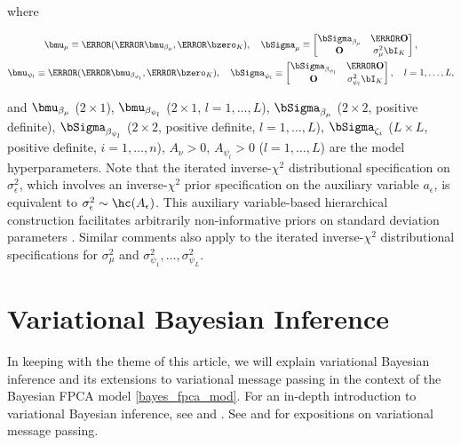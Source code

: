 \documentclass[ba]{imsart}
\numberwithin{equation}{section}
\theoremstyle{plain}
\def\sigsqeps{\sigma^2_{\epsilon}}
\def\aeps{a_{\epsilon}}
\def\sigsqmu{\sigma^2_{\mu}}
\newcommand\sigsqpsi[1]{\sigma^2_{\psi_{#1}}}
\begin{document}
\noindent where

\begin{equation}
\begin{gathered}
	\bmu_\mu \equiv \T{(\T{\bmu_{\beta_\mu}}, \T{\bzero_K})}, \quad
	\bSigma_\mu \equiv \begin{bmatrix}
		\bSigma_{\beta_\mu} & \T{\textbf{O}} \\
		\textbf{O} & \sigsqmu \bI_{K}
	\end{bmatrix}, \\
	$$
	\bmu_{\psi_l} \equiv \T{(\T{\bmu_{\beta_{\psi_l}}}, \T{\bzero_K})}, \quad
	\bSigma_{\psi_l} \equiv \begin{bmatrix}
		\bSigma_{\beta_{\psi_l}} & \T{\textbf{O}} \\
		\textbf{O} & \sigsqpsi{l} \bI_{K}
	\end{bmatrix}, \quad l = 1, \dots, L,
\end{gathered}
\label{sub_vecs_mats}
\end{equation}

\noindent and $\bmu_{\beta_\mu}$ ($2 \times 1$), $\bmu_{\beta_{\psi_l}}$ ($2 \times 1$, $l = 1, \dots, L$),
$\bSigma_{\beta_\mu}$ ($2 \times 2$, positive definite), $\bSigma_{\beta_{\psi_l}}$ ($2 \times 2$, positive definite,
$l = 1, \dots, L$), $\bSigma_{\zeta_i}$ ($L \times L$, positive definite, $i = 1, \dots, n$), $A_\nu > 0$,
$A_{\psi_l} > 0$ ($l = 1, \dots, L$) are the model hyperparameters.
Note that the iterated inverse-$\chi^2$ distributional specification on $\sigsqeps$,
which involves an inverse-$\chi^2$ prior specification on the auxiliary variable $\aeps$, is equivalent to $\sigsqeps \sim
\hc (A_{\epsilon})$. This auxiliary variable-based hierarchical construction facilitates arbitrarily non-informative
priors on standard deviation parameters \citep{gelman06}. Similar comments also apply to the iterated inverse-$\chi^2$
distributional specifications for $\sigsqmu$ and $\sigsqpsi{1}, \dots, \sigsqpsi{L}$.


\section{Variational Bayesian Inference}
\label{sec:vbi}

In keeping with the theme of this article, we will explain variational Bayesian inference and its extensions to
variational message passing in the context of the Bayesian FPCA model \eqref{bayes_fpca_mod}. For an
in-depth introduction to variational Bayesian inference, see \citet{ormerod10} and \citet{blei17}. See \citet{minka05}
and \citet{wand17} for expositions on variational message passing.
\end{document}
